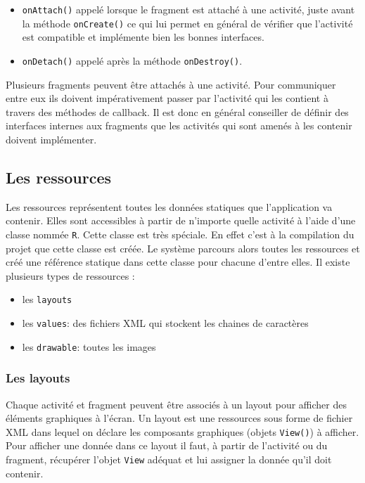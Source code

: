 \begin{itemize}
 	\item \verb!onAttach()! appelé lorsque le fragment est attaché à une activité, juste avant la méthode \verb!onCreate()! ce qui lui permet en général de vérifier que l'activité est compatible et implémente bien les bonnes interfaces.
 	\item \verb!onDetach()! appelé après la méthode \verb!onDestroy()!.
\end{itemize}\bigskip

Plusieurs fragments peuvent être attachés à une activité. Pour communiquer entre eux ils doivent impérativement passer par l'activité qui les contient à travers des méthodes de callback. Il est donc en général conseiller de définir des interfaces internes aux fragments que les activités qui sont amenés à les contenir doivent implémenter. 

\subsection{Les ressources}
Les ressources représentent toutes les données statiques que l'application va contenir. Elles sont accessibles à partir de n'importe quelle activité à l'aide d'une classe nommée \verb!R!. Cette classe est très spéciale. En effet c'est à la compilation du projet que cette classe est créée. Le système parcours alors toutes les ressources et créé une référence statique dans cette classe pour chacune d'entre elles.\bigskip
Il existe plusieurs types de ressources :\bigskip

\begin{itemize}
 	\item les \verb!layouts!
 	\item les \verb!values!: des fichiers XML qui stockent les chaines de caractères
 	\item les \verb!drawable!: toutes les images
\end{itemize}\bigskip

\subsubsection{Les layouts}
Chaque activité et fragment peuvent être associés à un layout pour afficher des éléments graphiques à l'écran. Un layout est une ressources sous forme de fichier XML dans lequel on déclare les composants graphiques (objets \verb!View()!) à afficher. Pour afficher une donnée dans ce layout il faut, à partir de l'activité ou du fragment, récupérer l'objet \verb!View! adéquat et lui assigner la donnée qu'il doit contenir. \bigskip

